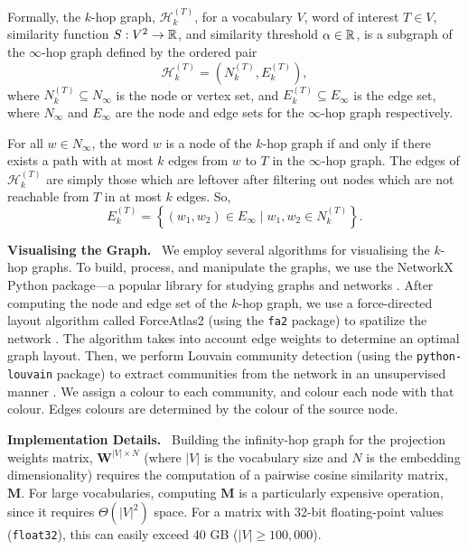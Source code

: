 \documentclass{paper}
\newcommand{\mat}[1]{\bm{#1}}
\newcommand{\inlineSection}[1]{\vspace{0.5em}\noindent\textbf{#1.}~}
\begin{document}
Formally, the $k$-hop graph, $\mathcal{H}_k^{(T)}$, for a vocabulary $V$, word of interest $T\in V$, similarity function $S:V^2\rightarrow\mathbb{R}$, and similarity threshold $\alpha\in\mathbb{R}$, is a subgraph of the $\infty$-hop graph defined by the ordered pair
\begin{equation*}
    \mathcal{H}_k^{(T)}=\left(N_k^{(T)}, E_k^{(T)}\right),
\end{equation*}
where $N_k^{(T)}\subseteq N_\infty$ is the node or vertex set, and $E_k^{(T)}\subseteq E_\infty$ is the edge set, where $N_\infty$ and $E_\infty$ are the node and edge sets for the $\infty$-hop graph respectively.

For all $w\in N_\infty$, the word $w$ is a node of the $k$-hop graph if and only if there exists a path with at most $k$ edges from $w$ to $T$ in the $\infty$-hop graph. The edges of $\mathcal{H}_k^{(T)}$ are simply those which are leftover after filtering out nodes which are not reachable from $T$ in at most $k$ edges. So,
\begin{equation*}
    E_k^{(T)}=\left\{(w_1,w_2)\in  E_\infty \mid w_1,w_2\in N_k^{(T)} \right\}.
\end{equation*}

\inlineSection{Visualising the Graph}  We employ several algorithms for visualising the $k$-hop graphs. To build, process, and manipulate the graphs, we use the NetworkX Python package---a popular library for studying graphs and networks \cite{networkx_docs}. After computing the node and edge set of the $k$-hop graph, we use a force-directed layout algorithm called ForceAtlas2 (using the \texttt{fa2} package) to spatilize the network \cite{Jacomy2014, fa2_networkx}. The algorithm takes into account edge weights to determine an optimal graph layout. Then, we perform Louvain  community detection (using the \texttt{python-louvain} package) to extract communities from the network in an unsupervised manner \cite{python_louvain, Blondel_2008}. We assign a colour to each community, and colour each node with that colour. Edges colours are determined by the colour of the source node.

\inlineSection{Implementation Details} Building the infinity-hop graph for the projection weights matrix, $\mat{W}^{|V|\times N}$ (where $|V|$ is the vocabulary size and $N$ is the embedding dimensionality) requires the computation of a pairwise cosine similarity matrix, $\mat{M}$. For large vocabularies, computing $\mat{M}$ is a particularly expensive operation, since it requires $\Theta(|V|^2)$ space. For a matrix with 32-bit floating-point values (\texttt{float32}), this can easily exceed 40 GB ($|V|\geq 100,000$).
\end{document}
